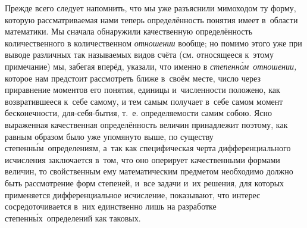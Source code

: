 Прежде всего следует напомнить, что мы уже разъяснили мимоходом ту форму,
которую рассматриваемая нами теперь определённость понятия имеет в~области
математики. Мы сначала обнаружили качественную определённость количественного в
количественном {\em отношении} вообще; но помимо этого уже при выводе различных
так называемых видов счёта (см. относящееся к~этому примечание) мы, забегая
вперёд, указали, что именно в {\em степенн\'{о}м~отношении,} которое нам
предстоит рассмотреть ближе в~своём месте, число через приравнение моментов его
понятия, единицы и~численности положено, как возвратившееся к~себе самому, и
тем самым получает в~себе самом момент бесконечности, для-себя-бытия, т.~е.
определяемости самим собою. Ясно выраженная качественная определённость величин
принадлежит поэтому, как равным образом было уже упомянуто выше, по существу
степенн\'{ы}м~определениям, а~так как специфическая черта дифференциального
исчисления заключается в~том, что оно оперирует качественными формами величин,
то свойственным ему математическим предметом необходимо должно быть
рассмотрение форм степеней, и~все задачи и~их решения, для которых применяется
дифференциальное исчисление, показывают, что интерес сосредоточивается в~них
единственно лишь на разработке степенн\'{ы}х~определений как таковых.

